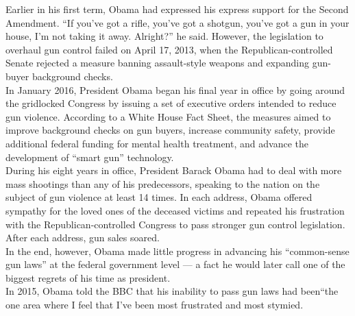 \begin{tcolorbox}[width=\linewidth,title={Example of a Retrieved Document}]
Earlier in his first term, Obama had expressed his express support for the Second Amendment. ``If you’ve got a rifle, you’ve got a shotgun, you’ve got a gun in your house, I’m not taking it away. Alright?” he said. However, the legislation to overhaul gun control failed on April 17, 2013, when the Republican-controlled Senate rejected a measure banning assault-style weapons and expanding gun-buyer background checks. \\
In January 2016, President Obama began his final year in office by going around the gridlocked Congress by issuing a set of executive orders intended to reduce gun violence. According to a White House Fact Sheet, the measures aimed to improve background checks on gun buyers, increase community safety, provide additional federal funding for mental health treatment, and advance the development of ``smart gun” technology. \\
During his eight years in office, President Barack Obama had to deal with more mass shootings than any of his predecessors, speaking to the nation on the subject of gun violence at least 14 times. In each address, Obama offered sympathy for the loved ones of the deceased victims and repeated his frustration with the Republican-controlled Congress to pass stronger gun control legislation. After each address, gun sales soared.\\
In the end, however, Obama made little progress in advancing his ``common-sense gun laws” at the federal government level — a fact he would later call one of the biggest regrets of his time as president.\\
In 2015, Obama told the BBC that his inability to pass gun laws had been``the one area where I feel that I've been most frustrated and most stymied.
\label{fig:example_doc_text}
\end{tcolorbox}


